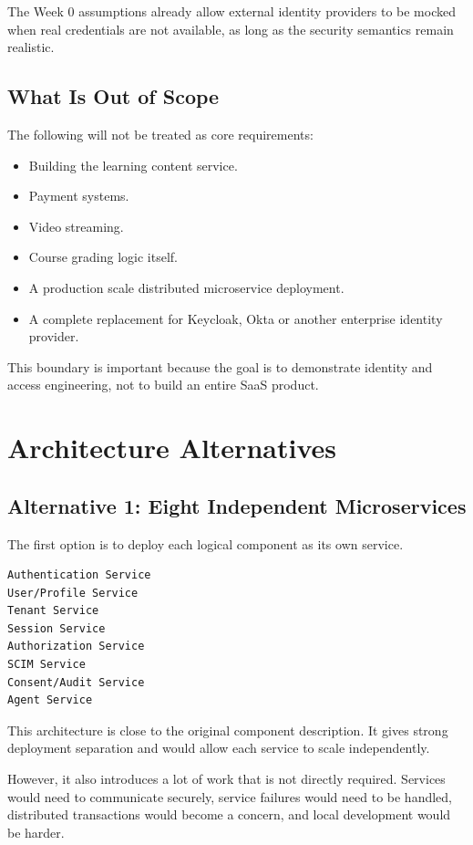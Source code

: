 \documentclass[11pt,a4paper]{article}
\begin{document}
The Week 0 assumptions already allow external identity providers to be mocked when real credentials are not available, as long as the security semantics remain realistic.

\subsection{What Is Out of Scope}

The following will not be treated as core requirements:

\begin{itemize}
    \item Building the learning content service.
    \item Payment systems.
    \item Video streaming.
    \item Course grading logic itself.
    \item A production scale distributed microservice deployment.
    \item A complete replacement for Keycloak, Okta or another enterprise identity provider.
\end{itemize}

This boundary is important because the goal is to demonstrate identity and access engineering, not to build an entire SaaS product.

\section{Architecture Alternatives}

\subsection{Alternative 1: Eight Independent Microservices}

The first option is to deploy each logical component as its own service.

\begin{verbatim}
Authentication Service
User/Profile Service
Tenant Service
Session Service
Authorization Service
SCIM Service
Consent/Audit Service
Agent Service
\end{verbatim}

This architecture is close to the original component description. It gives strong deployment separation and would allow each service to scale independently.

However, it also introduces a lot of work that is not directly required. Services would need to communicate securely, service failures would need to be handled, distributed transactions would become a concern, and local development would be harder.
\end{document}
